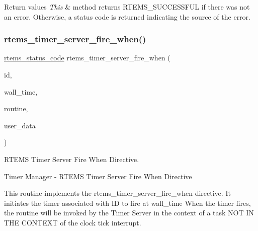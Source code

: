 \begin{DoxyRetVals}{Return values}
{\em This} & method returns R\+T\+E\+M\+S\+\_\+\+S\+U\+C\+C\+E\+S\+S\+F\+UL if there was not an error. Otherwise, a status code is returned indicating the source of the error. \\
\hline
\end{DoxyRetVals}
\mbox{\label{group__ClassicTimer_ga2bdd05c6144a723410df17dfaa125adc}} 
\subsubsection{\texorpdfstring{rtems\_timer\_server\_fire\_when()}{rtems\_timer\_server\_fire\_when()}}
{\footnotesize\ttfamily \mbox{\hyperlink{group__ClassicStatus_ga545d41846817eaba6143d52ee4d9e9fe}{rtems\+\_\+status\+\_\+code}} rtems\+\_\+timer\+\_\+server\+\_\+fire\+\_\+when (\begin{DoxyParamCaption}\item[{\mbox{\hyperlink{group__ClassicTasks_gab20892b814dced7dd4e5b9bf42becd57}{rtems\+\_\+id}}}]{id,  }\item[{\mbox{\hyperlink{structrtems__time__of__day}{rtems\+\_\+time\+\_\+of\+\_\+day}} $\ast$}]{wall\+\_\+time,  }\item[{\mbox{\hyperlink{group__ClassicTimer_gab7851346dd520066ddc58a25de671f51}{rtems\+\_\+timer\+\_\+service\+\_\+routine\+\_\+entry}}}]{routine,  }\item[{void $\ast$}]{user\+\_\+data }\end{DoxyParamCaption})}



R\+T\+E\+MS Timer Server Fire When Directive. 

Timer Manager -\/ R\+T\+E\+MS Timer Server Fire When Directive

This routine implements the rtems\+\_\+timer\+\_\+server\+\_\+fire\+\_\+when directive. It initiates the timer associated with ID to fire at wall\+\_\+time When the timer fires, the routine will be invoked by the Timer Server in the context of a task N\+OT IN T\+HE C\+O\+N\+T\+E\+XT of the clock tick interrupt. 